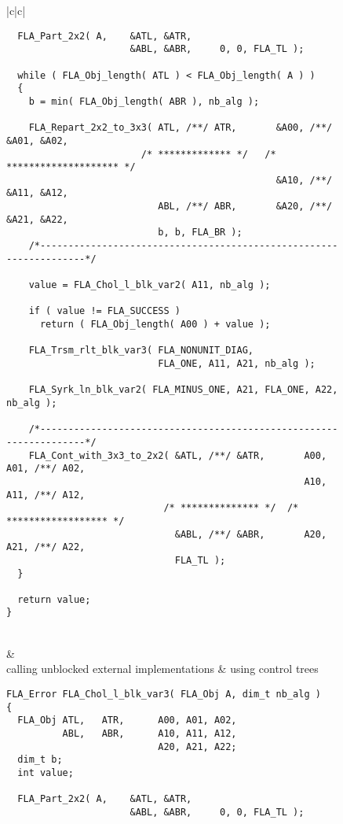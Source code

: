 \begin{figure}[tbp]
\begin{center}
\begin{tabular}{|c|c|}
\begin{minipage}[t]{3in}
{\begin{verbatim}
  FLA_Part_2x2( A,    &ATL, &ATR,
                      &ABL, &ABR,     0, 0, FLA_TL );

  while ( FLA_Obj_length( ATL ) < FLA_Obj_length( A ) )
  {
    b = min( FLA_Obj_length( ABR ), nb_alg );

    FLA_Repart_2x2_to_3x3( ATL, /**/ ATR,       &A00, /**/ &A01, &A02,
                        /* ************* */   /* ******************** */
                                                &A10, /**/ &A11, &A12,
                           ABL, /**/ ABR,       &A20, /**/ &A21, &A22,
                           b, b, FLA_BR );
    /*-------------------------------------------------------------------*/

    value = FLA_Chol_l_blk_var2( A11, nb_alg );

    if ( value != FLA_SUCCESS )
      return ( FLA_Obj_length( A00 ) + value );

    FLA_Trsm_rlt_blk_var3( FLA_NONUNIT_DIAG,
                           FLA_ONE, A11, A21, nb_alg );

    FLA_Syrk_ln_blk_var2( FLA_MINUS_ONE, A21, FLA_ONE, A22, nb_alg );

    /*-------------------------------------------------------------------*/
    FLA_Cont_with_3x3_to_2x2( &ATL, /**/ &ATR,       A00, A01, /**/ A02,
                                                     A10, A11, /**/ A12,
                            /* ************** */  /* ****************** */
                              &ABL, /**/ &ABR,       A20, A21, /**/ A22,
                              FLA_TL );
  }

  return value;
}
\end{verbatim}
}
\end{minipage}
\\
 & \\ \hline
calling unblocked external implementations & using control trees \\ \hline
\begin{minipage}[t]{3in}
{\tiny
\begin{verbatim}
FLA_Error FLA_Chol_l_blk_var3( FLA_Obj A, dim_t nb_alg )
{
  FLA_Obj ATL,   ATR,      A00, A01, A02,
          ABL,   ABR,      A10, A11, A12,
                           A20, A21, A22;
  dim_t b;
  int value;

  FLA_Part_2x2( A,    &ATL, &ATR,
                      &ABL, &ABR,     0, 0, FLA_TL );


\end{verbatim}}
\end{minipage}
\end{tabular}
\end{center}
\end{figure}
